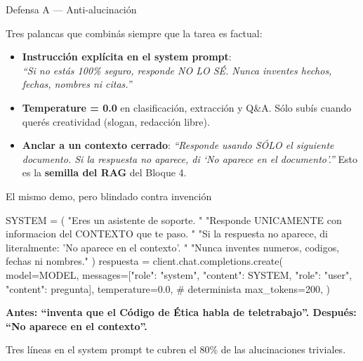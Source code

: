 \documentclass[aspectratio=169, 11pt]{beamer}
\begin{document}
\begin{frame}[shrink]{Defensa A --- Anti-alucinación}
  \vspace{4pt}
  \begin{tcolorbox}[colback=arcaGray, colframe=arcaRed, leftrule=3pt,
    boxrule=0pt, sharp corners, left=8pt, right=8pt, top=6pt, bottom=6pt]
    {\footnotesize\color{arcaDark}
    Tres palancas que combinás siempre que la tarea es factual:\par}
  \end{tcolorbox}
  \vspace{8pt}
  \begin{itemize}\setlength{\itemsep}{6pt}
    \footnotesize
    \item[\textbf{1.}] \textbf{Instrucción explícita en el system prompt}:\\
    \textit{``Si no estás 100\% seguro, responde NO LO SÉ. Nunca inventes hechos,
    fechas, nombres ni citas.''}
    \item[\textbf{2.}] \textbf{Temperature = 0.0} en clasificación, extracción y Q\&A.
    Sólo subís cuando querés creatividad (slogan, redacción libre).
    \item[\textbf{3.}] \textbf{Anclar a un contexto cerrado}: \textit{``Responde
    usando SÓLO el siguiente documento. Si la respuesta no aparece, di
    `No aparece en el documento'.''} Esto es la \textbf{semilla del RAG} del Bloque 4.
  \end{itemize}
\end{frame}

\begin{frame}{El mismo demo, pero blindado contra invención}
  \begin{pyblock}
SYSTEM = (
    "Eres un asistente de soporte. "
    "Responde UNICAMENTE con informacion del CONTEXTO que te paso. "
    "Si la respuesta no aparece, di literalmente: 'No aparece en el contexto'. "
    "Nunca inventes numeros, codigos, fechas ni nombres."
)
respuesta = client.chat.completions.create(
    model=MODEL,
    messages=[{"role": "system", "content": SYSTEM},
              {"role": "user",   "content": pregunta}],
    temperature=0.0,    # determinista
    max_tokens=200,
)
  \end{pyblock}
  \vspace{4pt}
  \begin{tcolorbox}[colback=arcaRed!8, colframe=arcaRed, leftrule=3pt,
    boxrule=0pt, sharp corners, left=8pt, right=8pt, top=4pt, bottom=4pt]
    {\footnotesize\color{arcaDark}\bfseries
    Antes: ``inventa que el Código de Ética habla de teletrabajo''.\quad
    Después: ``No aparece en el contexto''.\par}
    \vspace{2pt}
    {\footnotesize\color{arcaDark}
    Tres líneas en el system prompt te cubren el 80\% de las alucinaciones triviales.}
  \end{tcolorbox}
\end{frame}
\end{document}
